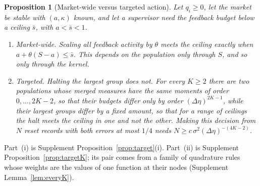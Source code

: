\documentclass[12pt]{article}
\newtheorem{proposition}[theorem]{Proposition}
\theoremstyle{definition}
\theoremstyle{remark}
\begin{document}
\begin{proposition}[Market-wide versus targeted action]\label{n:target}
Let $q_i\ge0$, let the market be stable with $(a,\kappa)$ known, and let a supervisor need the feedback budget below a ceiling $\bar s$, with $a<\bar s<1$.
\begin{enumerate}[label=(\roman*),itemsep=1pt]
\item \emph{Market-wide.} Scaling all feedback activity by $\theta$ meets the ceiling exactly when $a+\theta(S-a)\le\bar s$. This depends on the population only through $S$, and so only through the kernel.
\item \emph{Targeted.} Halting the largest group does not. For every $K\ge2$ there are two populations whose merged measures have the same moments of order $0,\ldots,2K-2$, so that their budgets differ only by order $(\Delta\eta)^{2K-1}$, while their largest groups differ by a fixed amount, so that for a range of ceilings the halt meets the ceiling in one and not the other. Making this decision from $N$ reset records with both errors at most $1/4$ needs $N\ge c\,\sigma^2(\Delta\eta)^{-(4K-2)}$.
\end{enumerate}
\end{proposition}

Part~(i) is Supplement Proposition~\ref{prop:target}(i). Part~(ii) is Supplement Proposition~\ref{prop:targetK}; its pair comes from a family of quadrature rules whose weights are the values of one function at their nodes (Supplement Lemma~\ref{lem:everyK}).
\end{document}
